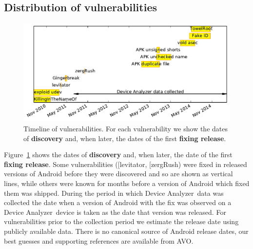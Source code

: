 \documentclass{llncs}
\makeatletter
\newcommand{\da}{Device Analyzer}
\newcommand{\avo}{AVO}
\def\avovuln{\@ifnextchar[{\@avovulnsspecific}{\@avovulngeneral}}
\def\@avovulnsspecific[#1]#2{\emph{\href{http://androidvulnerabilities.org/vulnerabilities/#1}{#2}}}
\def\@avovulngeneral#1{\emph{\href{http://androidvulnerabilities.org/vulnerabilities/#1}{#1}}}
\makeatother
\begin{document}
\subsection{Distribution of vulnerabilities}
\begin{figure}
 \centering
 \includegraphics[width=\columnwidth]{figures/vulnerabilities_timeline}
 \caption{Timeline of vulnerabilities. For each vulnerability we show the dates of \textbf{discovery} and, when later, the dates of the first \textbf{fixing release}.}
 \label{fig:vulnerabilities_timeline}
\end{figure}

Figure~\ref{fig:vulnerabilities_timeline} shows the dates of \textbf{discovery} and, when later, the date of the first \textbf{fixing release}.
Some vulnerabilities (\avovuln{levitator}, \avovuln{zergRush}) were fixed in released versions of Android before they were discovered and so are shown as vertical lines, while others were known for months before a version of Android which fixed them was shipped.
During the period in which \da\ data was collected the date when a version of Android with the fix was observed on a \da\ device is taken as the date that version was released.
For vulnerabilities prior to the collection period we estimate the release date using publicly available data.
There is no canonical source of Android release dates, our best guesses and supporting references are available from \avo.

\end{document}
